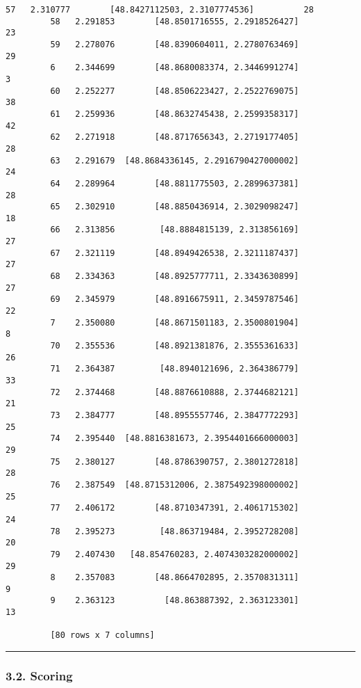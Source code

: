 \documentclass[11pt]{article}
\begin{document}
\begin{Verbatim}[commandchars=\\\{\}]
         57   2.310777        [48.8427112503, 2.3107774536]          28  
         58   2.291853        [48.8501716555, 2.2918526427]          23  
         59   2.278076        [48.8390604011, 2.2780763469]          29  
         6    2.344699        [48.8680083374, 2.3446991274]           3  
         60   2.252277        [48.8506223427, 2.2522769075]          38  
         61   2.259936        [48.8632745438, 2.2599358317]          42  
         62   2.271918        [48.8717656343, 2.2719177405]          28  
         63   2.291679  [48.8684336145, 2.2916790427000002]          24  
         64   2.289964        [48.8811775503, 2.2899637381]          28  
         65   2.302910        [48.8850436914, 2.3029098247]          18  
         66   2.313856         [48.8884815139, 2.313856169]          27  
         67   2.321119        [48.8949426538, 2.3211187437]          27  
         68   2.334363        [48.8925777711, 2.3343630899]          27  
         69   2.345979        [48.8916675911, 2.3459787546]          22  
         7    2.350080        [48.8671501183, 2.3500801904]           8  
         70   2.355536        [48.8921381876, 2.3555361633]          26  
         71   2.364387         [48.8940121696, 2.364386779]          33  
         72   2.374468        [48.8876610888, 2.3744682121]          21  
         73   2.384777        [48.8955557746, 2.3847772293]          25  
         74   2.395440  [48.8816381673, 2.3954401666000003]          29  
         75   2.380127        [48.8786390757, 2.3801272818]          28  
         76   2.387549  [48.8715312006, 2.3875492398000002]          25  
         77   2.406172        [48.8710347391, 2.4061715302]          24  
         78   2.395273         [48.863719484, 2.3952728208]          20  
         79   2.407430   [48.854760283, 2.4074303282000002]          29  
         8    2.357083        [48.8664702895, 2.3570831311]           9  
         9    2.363123          [48.863887392, 2.363123301]          13  
         
         [80 rows x 7 columns]
\end{Verbatim}
            
    \begin{center}\rule{0.5\linewidth}{\linethickness}\end{center}

\subsubsection{3.2. Scoring}\label{scoring}
\end{document}
